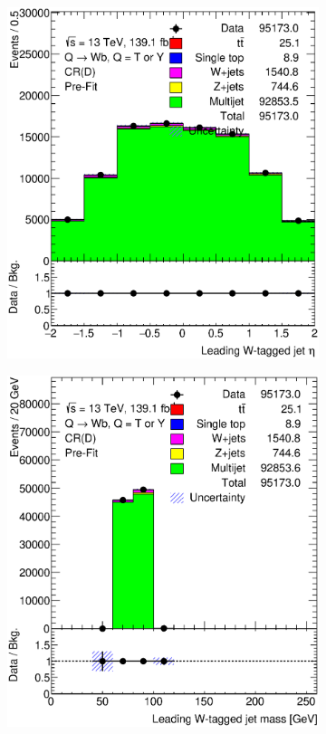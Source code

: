 \begin{figure}[hbt!]
\begin{subfigure}{.35\textwidth}
		\includegraphics[width=\linewidth,height=\textheight,keepaspectratio]{CR_D_ljet_eta.eps}
		\caption{}
		\label{fig:app:cr_d:ljet_eta}
	\end{subfigure}
	\begin{subfigure}{.35\textwidth}
		\centering
		\includegraphics[width=\linewidth,height=\textheight,keepaspectratio]{CR_D_ljet_m.eps}

\end{subfigure}
\end{figure}
